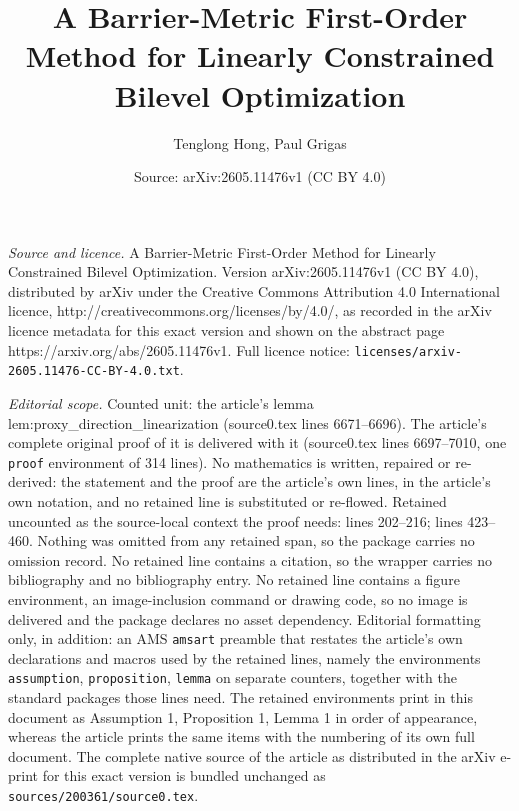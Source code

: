 \documentclass[10pt,a4paper]{amsart}
\title{A Barrier-Metric First-Order Method for Linearly Constrained Bilevel Optimization}
\author{Tenglong Hong, Paul Grigas}
\date{Source: arXiv:2605.11476v1 (CC BY 4.0)}
\begin{document}
\maketitle

\noindent\emph{Source and licence.} A Barrier-Metric First-Order Method for Linearly Constrained Bilevel Optimization. Version arXiv:2605.11476v1 (CC BY 4.0), distributed by arXiv under the Creative Commons Attribution 4.0 International licence, http://creativecommons.org/licenses/by/4.0/, as recorded in the arXiv licence metadata for this exact version and shown on the abstract page https://arxiv.org/abs/2605.11476v1. Full licence notice: \texttt{licenses/arxiv-2605.11476-CC-BY-4.0.txt}.\par\smallskip

\noindent\textit{Editorial scope.} Counted unit: the article's lemma lem:proxy\_direction\_linearization (source0.tex lines 6671--6696). The article's complete original proof of it is delivered with it (source0.tex lines 6697--7010, one \texttt{proof} environment of 314 lines). No mathematics is written, repaired or re-derived: the statement and the proof are the article's own lines, in the article's own notation, and no retained line is substituted or re-flowed.  Retained uncounted as the source-local context the proof needs: lines 202--216; lines 423--460.  Nothing was omitted from any retained span, so the package carries no omission record.  No retained line contains a citation, so the wrapper carries no bibliography and no bibliography entry.  No retained line contains a figure environment, an image-inclusion command or drawing code, so no image is delivered and the package declares no asset dependency.  Editorial formatting only, in addition: an AMS \texttt{amsart} preamble that restates the article's own declarations and macros used by the retained lines, namely the environments \texttt{assumption}, \texttt{proposition}, \texttt{lemma} on separate counters, together with the standard packages those lines need.  The retained environments print in this document as Assumption 1, Proposition 1, Lemma 1 in order of appearance, whereas the article prints the same items with the numbering of its own full document.  The complete native source of the article as distributed in the arXiv e-print for this exact version is bundled unchanged as \texttt{sources/200361/source0.tex}.
\end{document}
